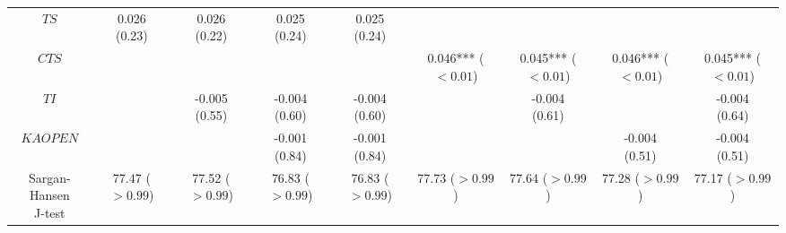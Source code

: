 \begin{tabular}{ccccccccc}
                                          $TS$ &          \makecell{0.026\\(0.23)} &          \makecell{0.026\\(0.22)} &          \makecell{0.025\\(0.24)} &          \makecell{0.025\\(0.24)} &                                   &                                   &                                   &                                   \\
                                         $CTS$ &                                   &                                   &                                   &                                   &   \makecell{0.046***\\($< 0.01$)} &   \makecell{0.045***\\($< 0.01$)} &   \makecell{0.046***\\($< 0.01$)} &   \makecell{0.045***\\($< 0.01$)} \\
                                          $TI$ &                                   &         \makecell{-0.005\\(0.55)} &         \makecell{-0.004\\(0.60)} &         \makecell{-0.004\\(0.60)} &                                   &         \makecell{-0.004\\(0.61)} &                                   &         \makecell{-0.004\\(0.64)} \\
                                      $KAOPEN$ &                                   &                                   &         \makecell{-0.001\\(0.84)} &         \makecell{-0.001\\(0.84)} &                                   &                                   &         \makecell{-0.004\\(0.51)} &         \makecell{-0.004\\(0.51)} \\
              \makecell{Sargan-Hansen\\J-test} &      \makecell{77.47\\($> 0.99$)} &      \makecell{77.52\\($> 0.99$)} &      \makecell{76.83\\($> 0.99$)} &      \makecell{76.83\\($> 0.99$)} &      \makecell{77.73\\($> 0.99$)} &      \makecell{77.64\\($> 0.99$)} &      \makecell{77.28\\($> 0.99$)} &      \makecell{77.17\\($> 0.99$)} \\

\end{tabular}
